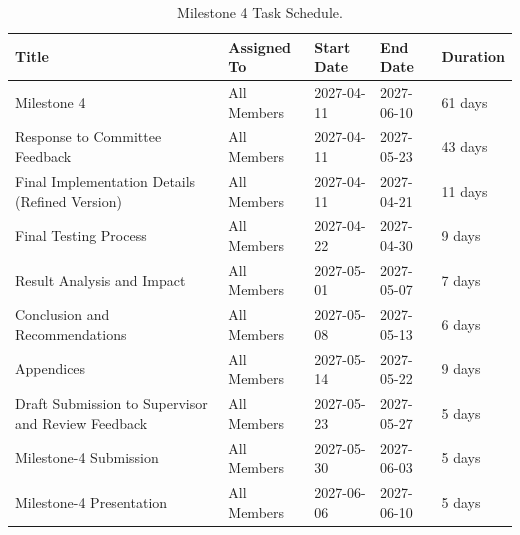 \documentclass[11pt,a4paper]{report}
\begin{document}
\begin{table}[H]
\centering
\caption[Milestone 4 Task Schedule]{Milestone 4 Task Schedule.}
\begin{tabular}{|p{}| p{}| p{}| p{}| p{}|}
\hline
\textbf{Title} & \textbf{Assigned To} & \textbf{Start Date} & \textbf{End Date} & \textbf{Duration} \\
\hline
Milestone 4 & All Members & 2027-04-11 & 2027-06-10 & 61 days \\
\hline
Response to Committee Feedback & All Members & 2027-04-11 & 2027-05-23 & 43 days \\
\hline
Final Implementation Details (Refined Version) & All Members & 2027-04-11 & 2027-04-21 & 11 days \\
\hline
Final Testing Process & All Members & 2027-04-22 & 2027-04-30 & 9 days \\
\hline
Result Analysis and Impact & All Members & 2027-05-01 & 2027-05-07 & 7 days \\
\hline
Conclusion and Recommendations & All Members & 2027-05-08 & 2027-05-13 & 6 days \\
\hline
Appendices & All Members & 2027-05-14 & 2027-05-22 & 9 days \\
\hline
Draft Submission to Supervisor and Review Feedback & All Members & 2027-05-23 & 2027-05-27 & 5 days \\
\hline
Milestone-4 Submission & All Members & 2027-05-30 & 2027-06-03 & 5 days \\
\hline
Milestone-4 Presentation & All Members & 2027-06-06 & 2027-06-10 & 5 days \\
\hline
\end{tabular}
\label{tab:milestone4_schedule}
\end{table}
\cleardoublepage
\printbibliography
{}

\end{document}
